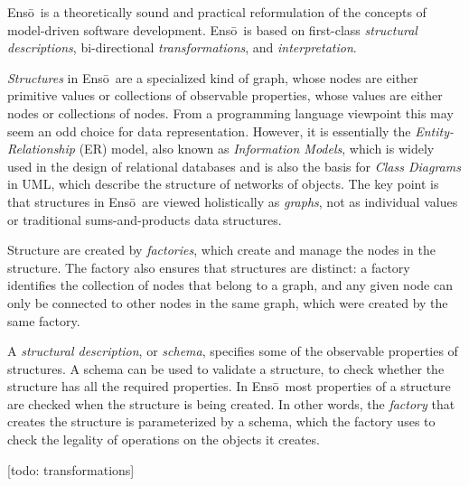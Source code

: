 \documentclass[11pt]{article}
\title{\Enso}
\author{William R. Cook and Tijs van der Storm}
\newcommand{\Enso}{Ens\={o}}
\begin{document}
\maketitle

\Enso\ is a theoretically sound and practical reformulation of the 
concepts of model-driven software development. \Enso\ is based
on first-class \textit{structural descriptions}, 
bi-directional \textit{transformations}, and \textit{interpretation}.

\textit{Structures} in \Enso\ are a specialized kind of graph,
whose nodes are either primitive values or collections of observable
properties, whose values are either nodes or collections of nodes.
From a programming language viewpoint this may seem an odd 
choice for data representation. However, it is essentially the
\textit{Entity-Relationship} (ER) model, also known as \textit{Information
Models}, which is widely used in the design of relational databases
and is also the basis for \textit{Class Diagrams} in UML, which 
describe the structure of networks of objects.
The key point is that structures in \Enso\ are 
viewed holistically as \textit{graphs}, not as individual values
or traditional sums-and-products data structures.

Structure are created by \textit{factories}, which create
and manage the nodes in the structure. The factory also
ensures that structures are distinct: a factory identifies the 
collection of nodes that belong to a graph, and any given node 
can only be connected to other nodes in the same graph, which were
created by the same factory.

A \textit{structural description}, or \textit{schema}, specifies some 
of the observable properties of structures. A schema can be used
to validate a structure, to check whether the structure has all the
required properties. In \Enso\ most properties of a structure are
checked when the structure is being created. In other words, 
the \textit{factory} that creates the structure is parameterized by a
schema, which the factory uses to check the legality of operations
on the objects it creates.

[todo: transformations]
\end{document}
